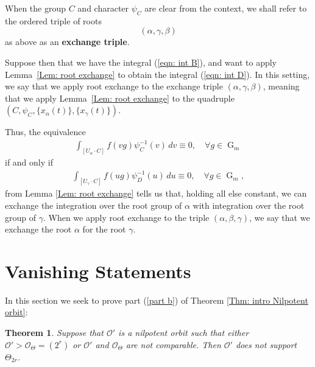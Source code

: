 \documentclass[11pt,reqno]{amsart}
\newtheorem{Thm}{Theorem}[section]
\theoremstyle{definition}
\theoremstyle{remark}
\theoremstyle{definition}
\begin{document}
When the group $C$ and character $\psi_C$ are clear from the context, we shall refer to the ordered triple of roots $$({\alpha},{\gamma},{\beta})$$ as above as an {\bf exchange triple}. 

 Suppose then that we have the integral (\ref{eqn: int B}), and want to apply Lemma~\ref{Lem: root exchange} to obtain the integral (\ref{eqn: int D}). In this setting, we say that we apply root exchange to the exchange triple $({\alpha},{\gamma},{\beta})$, meaning that we apply Lemma~\ref{Lem: root exchange} to the quadruple $(C, \psi_C, \{x_{\alpha}(t)\},\{x_{\gamma}(t)\})$.

Thus, the equivalence
\begin{align*}
\displaystyle \int_{[U_{\alpha}\cdot C]}f(vg)\psi_C^{-1}(v)\,dv \equiv 0, \quad \forall g\in \operatorname{G}_m 
\end{align*}
if and only if 
\begin{align*}
\displaystyle \int_{[U_{\gamma}\cdot C]}f(ug)\psi_D^{-1}(u)\,du \equiv 0, \quad \forall g\in \operatorname{G}_m,
\end{align*}
from Lemma \ref{Lem: root exchange} tells us that, holding all else constant, we can exchange the integration over the root group of ${\alpha}$ with integration over the root group of ${\gamma}$. When we apply root exchange to the triple $({\alpha}, {\beta}, {\gamma})$, we say that we exchange the root ${\alpha}$ for the root ${\gamma}$.

\section{Vanishing Statements}\label{Section: vanishing}

 In this section we seek to prove part (\ref{part b}) of Theorem \ref{Thm: intro Nilpotent orbit}:

\begin{Thm}\label{Thm: vanishing}
Suppose that ${\mathcal{O}}'$ is a nilpotent orbit such that either ${\mathcal{O}}'> {\mathcal{O}}_\Theta = (2^r)$ or ${\mathcal{O}}'$ and ${\mathcal{O}}_\Theta$ are not comparable. Then ${\mathcal{O}}'$ does not support $\Theta_{2r}$.
\end{Thm}
\end{document}
